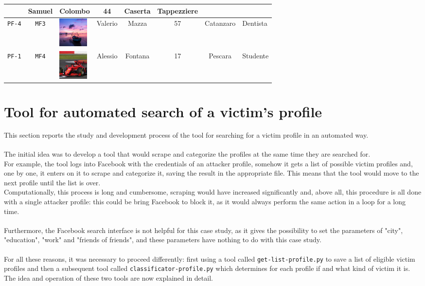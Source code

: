 \begin{tabular}[c]{ |c|c|m{1.5cm}|c|c|c|c|m{1.85cm}| }
	&Samuel&Colombo&44&Caserta&Tappezziere\\
	\hline
	\cellcolor[HTML]{b0d7ff}\texttt{PF-4}&\cellcolor[HTML]{e6f2ff}\texttt{MF3}&	
	\vspace{.15cm}
	\includegraphics[height=1.5cm]{immagini/MF3.jpg}
	&Valerio&Mazza&57&Catanzaro&Dentista\\
	\hline
	\cellcolor[HTML]{b0d7ff}\texttt{PF-1}&\cellcolor[HTML]{e6f2ff}\texttt{MF4}&	
	\vspace{.15cm}
	\includegraphics[height=1.5cm]{immagini/MF4.jpg}
	&Alessio&Fontana&17&Pescara&Studente\\
	\hline 	 	 	 	 	
\end{tabular}
\newpage
\section{Tool for automated search of a victim's profile}
This section reports the study and development process of the tool for searching for a victim profile in an automated way.\\\\
The initial idea was to develop a tool that would scrape and categorize the profiles at the same time they are searched for. 
\\For example, the tool logs into Facebook with the credentials of an attacker profile, somehow it gets a list of possible victim profiles and, one by one, it enters on it to scrape and categorize it, saving the result in the appropriate file. This means that the tool would move to the next profile until the list is over. \\
Computationally, this process is long and cumbersome, scraping would have increased significantly and, above all, this procedure is all done with a single attacker profile: this could be bring Facebook to block it, as it would always perform the same action in a loop for a long time.
\\\\Furthermore, the Facebook search interface is not helpful for this case study, as it gives the possibility to set the parameters of "city", "education", "work" and "friends of friends", and these parameters have nothing to do with this case study. \\\\
For all these reasons, it was necessary to proceed differently: first using a tool called \texttt{get-list-profile.py} to save a list of eligible victim profiles and then a subsequent tool called \texttt{classificator-profile.py} which determines for each profile if and what kind of victim it is.\\
The idea and operation of these two tools are now explained in detail.

